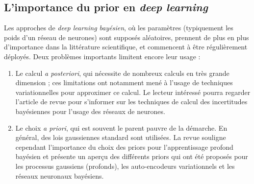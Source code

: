 \subsection{L'importance du prior en {\it deep learning}}

Les approches de {\it deep learning bayésien}, où les paramètres (typiquement les poids d'un réseau de neurones) sont supposés aléatoires, prennent de plus en plus d'importance dans la littérature scientifique, et commencent à être régulièrement déployés. Deux problèmes importants limitent encore leur usage :
\begin{enumerate}
    \item Le calcul {\it a posteriori}, qui nécessite de nombreux calculs en très grande dimension ; ces limitations ont notamment mené à l'usage de techniques variationnelles pour approximer ce calcul. Le lecteur intéressé pourra regarder l'article de revue \cite{Gawlikowski2021ASO} pour s'informer sur les techniques de calcul des incertitudes bayésiennes pour l'usage des réseaux de neurones.
    \item Le choix {\it a priori}, qui est souvent le parent pauvre de la démarche. En général, des lois gaussiennes standard sont utilisées. La revue \cite{Fortuin2022} souligne cependant l'importance du choix des priors pour l'apprentissage profond bayésien et présente un aperçu des différents priors qui ont été proposés pour les processus gaussiens (profonds), les auto-encodeurs variationnels et les réseaux neuronaux bayésiens.
\end{enumerate}


